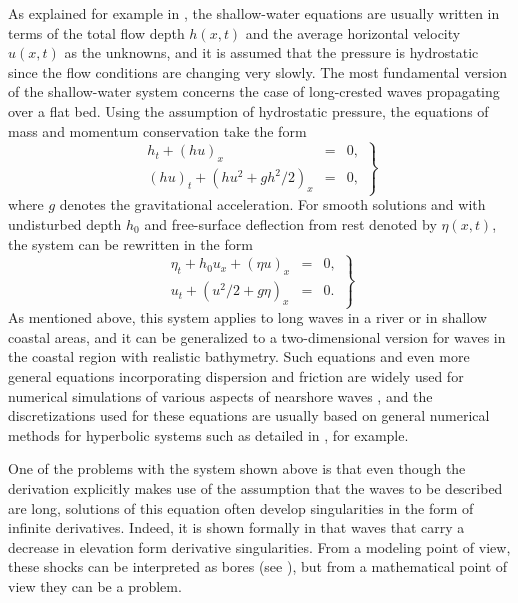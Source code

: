 \documentclass[reqno,12pt,a4paper]{article}
\theoremstyle{plain}
\begin{document}
As explained for example in \cite{Stoker}, the shallow-water equations are 
usually written in terms of the total flow depth $h(x,t)$ and the average 
horizontal velocity $u(x,t)$ as the unknowns, and it is assumed that 
the pressure is hydrostatic since the flow conditions are changing very slowly.
The most fundamental version of the shallow-water system concerns 
the case of long-crested waves propagating over a flat bed. 
Using the assumption of hydrostatic pressure, 
the equations of mass and momentum conservation take the form
\begin{equation}
\label{SWsystem_1}
\left.
\begin{array}{rcl}
h_t +  (h u )_x & = & 0, \\
(hu)_t + ( hu^2 + g h^2/2)_x          & = & 0,
\end{array}
\right\}
\end{equation}
\noindent
where $g$ denotes the gravitational acceleration.
For smooth solutions and with undisturbed depth $h_0$ and free-surface deflection
from rest denoted by $\eta(x,t)$, the system can be rewritten in the form
\begin{equation}
\label{SWsystem}
\left.
\begin{array}{rcl}
\eta_t + h_0 u_x  + (\eta u )_x & = & 0, \\
u_t + (u^2/2 + g \eta )_x          & = & 0.
\end{array}
\right\}
\end{equation}
As mentioned above, this system applies to long waves in a river or 
in shallow coastal areas, and it can be generalized to a two-dimensional 
version for waves in the coastal region with realistic bathymetry.
Such equations and even more general equations incorporating dispersion
and friction are widely used for numerical simulations of various aspects of
nearshore waves \cite{Bondehagen_Roeber_Kalisch_Buckley2024, Kalisch_Lagona_Roeber2024, Roeber2010}, and the discretizations
used for these equations are usually based on general numerical
methods for hyperbolic systems such as detailed in
\cite{LeVeque}, for example.

One of the problems with the system shown above is that
even though the derivation explicitly makes use of the assumption that
the waves to be described are long, solutions of this equation
often develop singularities in the form of infinite derivatives.
Indeed, it is shown formally in \cite{Whitham} that waves that
carry a decrease in elevation form derivative singularities. From a modeling point of view, these shocks can be interpreted as bores (see \cite{Ali_Kalisch2010,Favre1935,Whitham}), but from a mathematical point of view they can be a problem.
\end{document}
